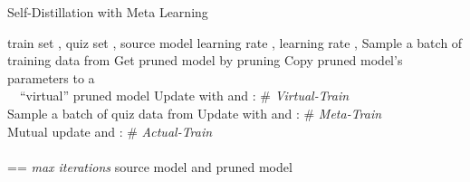 \documentclass[11pt]{article}
\begin{document}
\begin{algorithm}[H]
\renewcommand{\algorithmicensure}{\textbf{Output:}}
	\caption{Self-Distillation with Meta Learning}
	\label{alg1}
	\begin{algorithmic}[1]
		\REQUIRE train set , quiz set , source model 
		\REQUIRE learning rate , learning rate , 
		\REPEAT
\STATE 
		\STATE Sample a batch of training data  from 
		\STATE Get pruned model  by pruning  
		\STATE Copy pruned model's parameters  to a\\
		~~``virtual'' pruned model 
\STATE Update  with  and : \# \textit{Virtual-Train} \\ \hspace{\algorithmicindent} 
		\STATE Sample a batch of quiz data  from 
		\STATE Update  with  and : \# \textit{Meta-Train} \\ \hspace{\algorithmicindent} 
		\STATE Mutual update  and : \# \textit{Actual-Train} \\
		    \hspace{\algorithmicindent}\\
		    \hspace{\algorithmicindent} 
		\UNTIL  == \textit{max iterations}
\ENSURE source model  and pruned model 
	\end{algorithmic}  
\end{algorithm}
\end{document}
